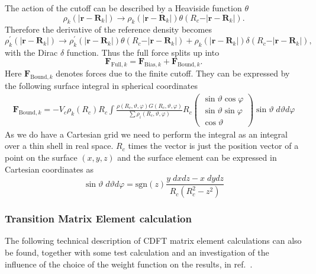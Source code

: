 \documentclass[twoside,10pt,titlepage,a4paper]{article}
\newcommand{\sgn}{\mathrm{sgn}}
\begin{document}
The action of the cutoff can be described by a Heaviside function $\theta$
\begin{equation}
\rho_k(\vert\mathbf{r}-\mathbf{R}_k\vert)\rightarrow\rho_k(\vert\mathbf{r}-\mathbf{R}_k\vert)\theta(R_c-\vert\mathbf{r}-\mathbf{R}_k\vert).
\end{equation}
Therefore the derivative of the reference density becomes
\begin{equation}
\rho_k^\prime(\vert\mathbf{r}-\mathbf{R}_k\vert)\rightarrow\rho_k^\prime(\vert\mathbf{r}-\mathbf{R}_k\vert)\theta(R_c-\vert\mathbf{r}-\mathbf{R}_k\vert)+\rho_k(\vert\mathbf{r}-\mathbf{R}_k\vert)\delta(R_c-\vert\mathbf{r}-\mathbf{R}_k\vert),
\end{equation}
with the Dirac $\delta$ function. Thus the full force splits up into 
\begin{equation}
\mathbf{F}_{\text{Full},k}=\mathbf{F}_{\text{Bias},k}+\mathbf{F}_{\text{Bound},k}.
\end{equation}
Here $\mathbf{F}_{\text{Bound},k}$ denotes forces due to the finite cutoff. They can be expressed by the following surface integral in spherical coordinates
\begin{eqnarray}
\mathbf{F}_{\text{Bound},k}=-V_c \rho_k(R_c) R_c \int \frac{\rho(R_c,\vartheta,\varphi)G(R_c,\vartheta,\varphi)}{\sum \rho_i(R_c,\vartheta,\varphi)}R_c
\left(
\begin{array}{c}
\sin\vartheta\cos\varphi\\
\sin\vartheta\sin\varphi\\
\cos\vartheta
\end{array}
\right)\sin\vartheta \;d\vartheta d\varphi
\end{eqnarray}
As we do have a Cartesian grid we need to perform the integral as an integral over a thin shell in
real space. $R_c$ times the vector is just the position vector of a point on the surface $(x,y,z)$
and the surface element can be expressed in Cartesian coordinates as \begin{equation}
\sin\vartheta\;d\vartheta d\varphi = \sgn(z) \frac{y\;dx dz-x\;dy dz}{R_c(R_c^2-z^2)}
\end{equation}

\subsubsection{Transition Matrix Element calculation}
The following technical description of CDFT matrix element calculations can also be found, together with some test calculation and an investigation of the influence of the choice of the weight function on the results, in ref.~\cite{Oberhofer10acie}.
\end{document}

